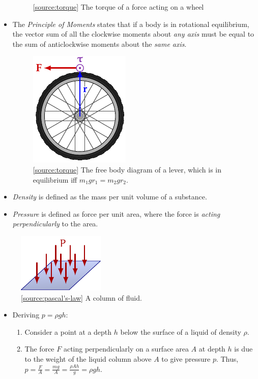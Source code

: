 \documentclass[oneside]{book}
\begin{document}
\begin{itemize}
\begin{figure}[H]
        \caption{\ref{source:torque} The torque of a force acting on a wheel}
        \label{fig:torque-wheel}
    \end{figure}
    \item The \emph{Principle of Moments} states that if a body is in rotational equilibrium, the vector sum of all the clockwise moments about \emph{any axis} must be equal to the sum of anticlockwise moments about the \emph{same axis}.
    \begin{figure}[H]
        \centering
        \includegraphics[page=4]{../images/torque/torque.pdf}
        \caption{\ref{source:torque} The free body diagram of a lever, which is in equilibrium iff \(m_1gr_1=m_2gr_2\).}
        \label{fig:torque-lever}
    \end{figure}
    \item \emph{Density} is defined as the mass per unit volume of a substance.
    \item \emph{Pressure} is defined as force per unit area, where the force is \emph{acting perpendicularly} to the area.
\end{itemize}
\begin{minipage}{0.3\textwidth}
    \begin{figure}[H]
        \centering
        \includegraphics[page=5]{../images/pressure/pressure.pdf}
        \caption{\ref{source:pascal's-law} A column of fluid.}
        \label{fig:pascal's-law}
    \end{figure}
\end{minipage}%
\begin{minipage}{0.7\textwidth}
    \begin{itemize}
        \item Deriving \(p=\rho gh\):
        \begin{enumerate}
            \item Consider a point at a depth \(h\) below the surface of a liquid of density \(\rho\). 
            \item The force \(F\) acting perpendicularly on a surface area \(A\) at depth \(h\) is due to the weight of the liquid column above \(A\) to give pressure \(p\). Thus, \(p=\frac{F}{A}=\frac{mg}{A}=\frac{\rho Ah}{g}=\rho gh\).
        \end{enumerate}
    \end{itemize}
\end{minipage}
\end{document}
